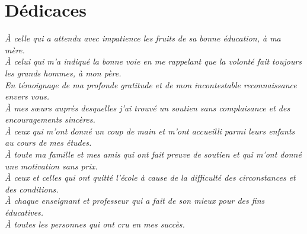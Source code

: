 \chapter*{Dédicaces}
\mtcaddchapter[Dédicaces]
\label{chap:didicace}
\textit{À celle qui a attendu avec impatience les fruits de sa bonne éducation, à ma mère.\\
À celui qui m'a indiqué la bonne voie en me rappelant que la volonté fait toujours les grands hommes, à mon père.\\
En témoignage de ma profonde gratitude et de mon incontestable reconnaissance envers vous.\\
À mes sœurs auprès desquelles j'ai trouvé un soutien sans complaisance et des encouragements sincères.\\
À ceux qui m'ont donné un coup de main et m'ont accueilli parmi leurs enfants au cours de mes études.\\
À toute ma famille et mes amis qui ont fait preuve de soutien et qui m’ont donné une motivation sans prix.\\
À ceux et celles qui ont quitté l'école à cause de la difficulté des circonstances et des conditions.\\
À chaque enseignant et professeur qui a fait de son mieux pour des fins éducatives.\\
À toutes les personnes qui ont cru en mes succès.}
